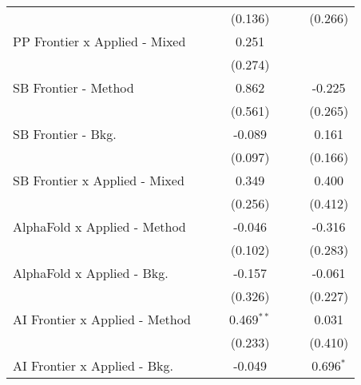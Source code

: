 \begin{tabular}{lcccccc}
                                  &                &              & (0.136)        &               &               & (0.266)\\   
   PP Frontier x Applied - Mixed  &                &              & 0.251          &               &               &   \\   
                                  &                &              & (0.274)        &               &               &   \\   
   SB Frontier - Method           &                &              & 0.862          &               &               & -0.225\\   
                                  &                &              & (0.561)        &               &               & (0.265)\\   
   SB Frontier - Bkg.             &                &              & -0.089         &               &               & 0.161\\   
                                  &                &              & (0.097)        &               &               & (0.166)\\   
   SB Frontier x Applied - Mixed  &                &              & 0.349          &               &               & 0.400\\   
                                  &                &              & (0.256)        &               &               & (0.412)\\   
   AlphaFold x Applied - Method   &                &              & -0.046         &               &               & -0.316\\   
                                  &                &              & (0.102)        &               &               & (0.283)\\   
   AlphaFold x Applied - Bkg.     &                &              & -0.157         &               &               & -0.061\\   
                                  &                &              & (0.326)        &               &               & (0.227)\\   
   AI Frontier x Applied - Method &                &              & 0.469$^{**}$   &               &               & 0.031\\   
                                  &                &              & (0.233)        &               &               & (0.410)\\   
   AI Frontier x Applied - Bkg.   &                &              & -0.049         &               &               & 0.696$^{*}$\\   

\end{tabular}
